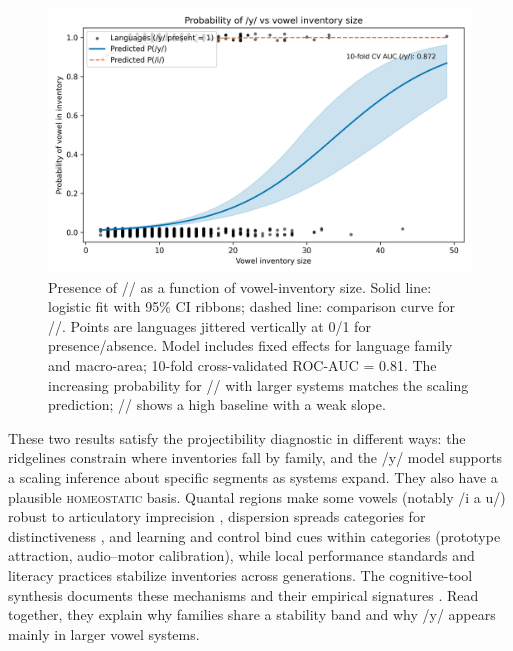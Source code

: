 \documentclass[12pt]{article}
\begin{document}

\begin{figure}[t]
  \centering
  \includegraphics[width=\linewidth]{images/y_vs_vowel_inventory.png}
  \caption{Presence of // as a function of vowel-inventory size.
  Solid line: logistic fit with 95\% CI ribbons; dashed line: comparison curve for //.
  Points are languages jittered vertically at 0/1 for presence/absence.
  Model includes fixed effects for language family and macro-area; 10-fold cross-validated ROC-AUC = 0.81.
  The increasing probability for // with larger systems matches the scaling prediction; // shows a high baseline with a weak slope.}
  \label{fig:y-scaling}
\end{figure}

These two results satisfy the projectibility diagnostic in different ways: the ridgelines constrain where inventories fall by family, and the /y/ model supports a scaling inference about specific segments as systems expand. They also have a plausible \textsc{homeostatic} basis. Quantal regions make some vowels (notably /i a u/) robust to articulatory imprecision \citep{Stevens1989Quantal}, dispersion spreads categories for distinctiveness \citep{LiljencrantsLindblom1972,Lindblom1990HandH}, and learning and control bind cues within categories (prototype attraction, audio–motor calibration), while local performance standards and literacy practices stabilize inventories across generations. The cognitive-tool synthesis documents these mechanisms and their empirical signatures \citep[Fig.\,1; Fig.\,2; Table~1]{Ekstrom2025PhonemeTool}. Read together, they explain why families share a stability band and why /y/ appears mainly in larger vowel systems.
\end{document}
